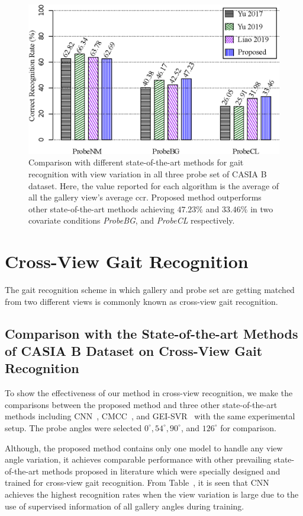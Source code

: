 \begin{figure}
	\centering
	\includegraphics[width = 115mm]{figures/comp_casia_b_with_view.eps}
	\caption{
		Comparison with different state-of-the-art methods for gait recognition with view variation in all three probe set of CASIA B dataset. Here, the value reported for each algorithm is the average of all the gallery view's average \gls{ccr}. Proposed method outperforms other state-of-the-art methods achieving $47.23\%$ and $33.46\%$ in two covariate conditions \textit{ProbeBG}, and \textit{ProbeCL} respectively.  
	}
	\label{fig:comp_casia_b_with_view}
\end{figure}




\section{Cross-View Gait Recognition}
The gait recognition scheme in which gallery and probe set are getting matched from two different views is commonly known as cross-view gait recognition.

\subsection{Comparison with the State-of-the-art Methods of CASIA B Dataset on Cross-View Gait Recognition}
To show the effectiveness of our method in cross-view recognition, we make the comparisons between the proposed method and three other state-of-the-art methods including CNN~\cite{Wu_17}, CMCC~\cite{Kusakunniran_14}, and GEI-SVR~\cite{Kusakunniran_10} with the same experimental setup. The probe angles were selected $0^{\circ}, 54^{\circ}, 90^{\circ}$, and $126^{\circ}$ for comparison. 

Although, the proposed method contains only one model to handle any view angle variation, it achieves comparable performance with other prevailing state-of-the-art methods proposed in literature which were specially designed and trained for cross-view gait recognition. From Table~\cite{table:comp_casia_b_cross_view}, it is seen that CNN~\cite{Wu_17} achieves the highest recognition rates when the view variation is large due to the use of supervised information of all gallery angles during training.


